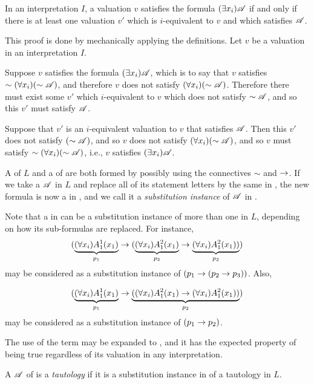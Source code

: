 \begin{proposition}
  In an interpretation \(I\), a valuation \(v\) satisfies the formula \((\exists x_i) \mathscr{A}\) if and only if there is at least one valuation \(v'\) which is \(i\)-equivalent to \(v\) and which satisfies \(\mathscr{A}\).

  \prf{} This proof is done by mechanically applying the definitions. Let \(v\) be a valuation in an interpretation \(I\).

  \Ra{} Suppose \(v\) satisfies the formula \((\exists x_i) \mathscr{A}\), which is to say that \(v\) satisfies \(\sim (\forall x_i) (\sim\mathscr{A})\), and therefore \(v\) does not satisfy \((\forall x_i) (\sim\mathscr{A})\). Therefore there must exist some \(v'\) which \(i\)-equivalent to \(v\) which does not satisfy \(\sim\mathscr{A}\), and so this \(v'\) must satisfy \(\mathscr{A}\).

  \La{} Suppose that \(v'\) is an \(i\)-equivalent valuation to \(v\) that satisfies \(\mathscr{A}\). Then this \(v'\) does not satisfy \((\sim\mathscr{A})\), and so \(v\) does not satisfy \((\forall x_i)(\sim\mathscr{A})\), and so \(v\) must satisfy \(\sim(\forall x_i)(\sim\mathscr{A})\), i.e., \(v\) satisfies \((\exists x_i)\mathscr{A}\). 
\end{proposition}

A \wf{} of \(L\) and a \wf{} of \cl{} are both formed by possibly using the connectives \(\sim\) and \(\rightarrow\). If we take a \wf{} \(\mathscr{A}\) in \(L\) and replace all of its statement letters by the same \wf{} in \cl{}, the new formula is now a \wf{} in \cl{}, and we call it a \textit{substitution instance} of \(\mathscr{A}\) in \cl{}.

Note that a \wf{} in \cl{} can be a substitution instance of more than one \wf{} in \(L\), depending on how its sub-formulas are replaced. For instance,
\[(\underbrace{(\forall x_i)A^1_1(x_1)}_{p_1} \rightarrow (\underbrace{(\forall x_i)A^2_1(x_1)}_{p_2} \rightarrow \underbrace{(\forall x_i)A^2_1(x_1))}_{p_3})\]
may be considered as a substitution instance of \((p_1 \rightarrow (p_2 \rightarrow p_3))\). Also,

\[(\underbrace{(\forall x_i)A^1_1(x_1)}_{p_1} \rightarrow \underbrace{((\forall x_i)A^2_1(x_1) \rightarrow (\forall x_i)A^2_1(x_1))}_{p_2})\]
may be considered as a substitution instance of \((p_1 \rightarrow p_2)\).

The use of the term  may be expanded to \cl{}, and it has the expected property of being true regardless of its valuation in any interpretation.

\begin{definition}
  A \wf{} \(\mathscr{A}\) of \cl{} is a \textit{tautology} if it is a substitution instance in \cl{} of a tautology in \(L\).
\end{definition}

